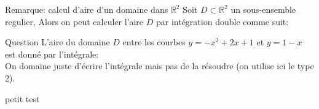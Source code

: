 \begin{parag}{Remarque: calcul d'aire d'un domaine dans $\mathbb{R}^{2}$}
    Soit $D \subset \mathbb{R}^{2}$ un sous-ensemble regulier, Alors on peut calculer l'aire $D$ par intégration double comme suit:
\end{parag}
\begin{parag}{Question}
    L'aire du domaine $D$ entre les courbes $y =  -x^2 + 2x +  1$ et $y = 1 - x$ est donné par l'intégrale:\\
    On domaine juste d'écrire l'intégrale mais pas de la résoudre (on utilise ici le type 2).
    

\end{parag}

petit test



